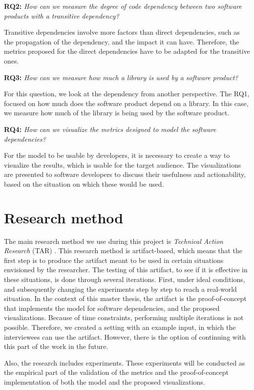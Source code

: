 \blankl
\textbf{RQ2:} \textit{How can we measure the degree of code dependency between two software products with a transitive dependency?}

\blankls
Transitive dependencies involve more factors than direct dependencies, such as the propagation of the dependency, and the impact it can have. Therefore, the metrics proposed for the direct dependencies have to be adapted for the transitive ones.

\blankl
\textbf{RQ3:} \textit{How can we measure how much a library is used by a software product?}

\blankls
For this question, we look at the dependency from another perspective. The RQ1, focused on how much does the software product depend on a library. In this case, we measure how much of the library is being used by the software product.

\blankl
\textbf{RQ4:} \textit{How can we visualize the metrics designed to model the software dependencies?}

\blankls
For the model to be usable by developers, it is necessary to create a way to visualize the results, which is usable for the target audience. The visualizations are presented to software developers to discuss their usefulness and actionability, based on the situation on which these would be used.

\section{Research method}
The main research method we use during this project is \textit{Technical Action Research} (TAR) \cite{wieringa2012technical}.
This research method is artifact-based, which means that the first step is to produce the artifact meant to be used in certain situations envisioned by the researcher. The testing of this artifact, to see if it is effective in these situations, is done through several iterations. First, under ideal conditions, and subsequently changing the experiments step by step to reach a real-world situation. In the context of this master thesis, the artifact is the proof-of-concept that implements the model for software dependencies, and the proposed visualizations. Because of time constraints, performing multiple iterations is not possible. Therefore, we created a setting with an example input, in which the interviewees can use the artifact. However, there is the option of continuing with this part of the work in the future.

\blankl
Also, the research includes experiments. These experiments will be conducted as the empirical part of the validation of the metrics and the proof-of-concept implementation of both the model and the proposed visualizations.

